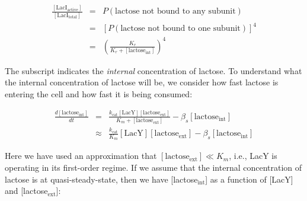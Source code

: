 \documentclass{article}
\begin{document}
\begin{eqnarray*}
 \frac{\left[\textrm{LacI}_{\textrm{active}} \right]}{\left[\textrm{LacI}_{\textrm{total}} \right]} & = & P\left( \textrm{lactose not bound to any subunit} \right)\\
 & = & \left[ P\left( \textrm{lactose not bound to one subunit} \right) \right]^4\\
  & = & \left( \frac{K_r}{K_r + \left[ \textrm{lactose}_{\textrm{int}} \right]} \right)^4
  \end{eqnarray*}

The subscript indicates the \textit{internal} concentration of lactose. To understand what the internal concentration of lactose will be, we consider how fast lactose is entering the cell and how fast it is being consumed:

\begin{eqnarray*}
 \frac{d \left[ \textrm{lactose}_{\textrm{int}} \right]}{dt} & = & \frac{k_{\textrm{cat}} \left[ \textrm{LacY} \right]  \left[ \textrm{lactose}_{\textrm{ext}} \right]}{K_m +  \left[ \textrm{lactose}_{\textrm{ext}} \right]} - \beta_s  \left[ \textrm{lactose}_{\textrm{int}} \right]\\
 & \approx & \frac{k_{\textrm{cat}}}{K_m} \left[ \textrm{LacY} \right]  \left[ \textrm{lactose}_{\textrm{ext}} \right] - \beta_s  \left[ \textrm{lactose}_{\textrm{int}} \right]
 \end{eqnarray*}
 
 Here we have used an approximation that $\left[ \textrm{lactose}_{\textrm{ext}} \right] \ll K_m$, i.e., LacY is operating in its first-order regime. If we assume that the internal concentration of lactose is at quasi-steady-state, then we have [lactose$_{\textrm{int}}$] as a function of [LacY] and [lactose$_{\textrm{ext}}$]:
 
\end{document}
